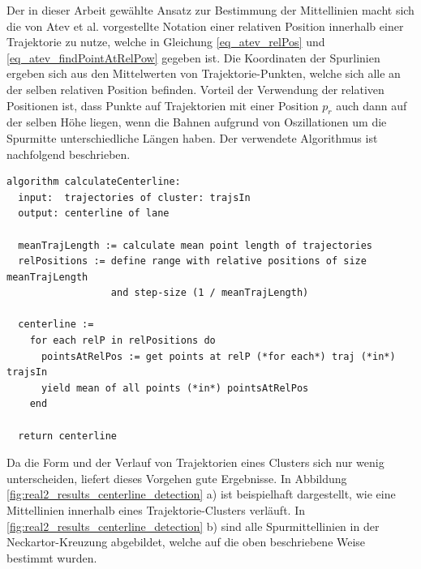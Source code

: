 Der in dieser Arbeit gewählte Ansatz zur Bestimmung der Mittellinien macht sich die von Atev et al.
vorgestellte Notation einer relativen Position innerhalb einer Trajektorie zu nutze, welche in
Gleichung \ref{eq_atev_relPos} und \ref{eq_atev_findPointAtRelPow} gegeben ist.
Die Koordinaten der Spurlinien ergeben sich aus den Mittelwerten von Trajektorie-Punkten, welche sich
alle an der selben relativen Position befinden. Vorteil der Verwendung der relativen Positionen ist,
dass Punkte auf Trajektorien mit einer Position $p_r$ auch dann auf der selben Höhe liegen,
wenn die Bahnen aufgrund von Oszillationen um die Spurmitte unterschiedliche Längen haben.
Der verwendete Algorithmus ist nachfolgend beschrieben.
\begin{lstlisting}[caption=Pseudocode Mittellinien-Bestimmung, language=Pseudo, label=lst:pseudo_centerline_definition]
algorithm calculateCenterline:
  input:  trajectories of cluster: trajsIn
  output: centerline of lane

  meanTrajLength := calculate mean point length of trajectories
  relPositions := define range with relative positions of size meanTrajLength
                  and step-size (1 / meanTrajLength)

  centerline :=
    for each relP in relPositions do
      pointsAtRelPos := get points at relP (*for each*) traj (*in*) trajsIn
      yield mean of all points (*in*) pointsAtRelPos
    end

  return centerline
\end{lstlisting}

Da die Form und der Verlauf von Trajektorien eines Clusters sich nur wenig unterscheiden, liefert dieses
Vorgehen gute Ergebnisse. In Abbildung \ref{fig:real2_results_centerline_detection} a) ist beispielhaft
dargestellt, wie eine Mittellinien innerhalb eines Trajektorie-Clusters verläuft.
In \ref{fig:real2_results_centerline_detection} b) sind alle Spurmittellinien in der Neckartor-Kreuzung abgebildet,
welche auf die oben beschriebene Weise bestimmt wurden.

